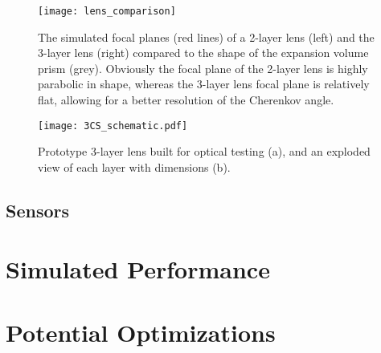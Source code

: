 \begin{figure}[ht]
	\centering
	\texttt{[image: lens\_comparison]}
	\caption{The simulated focal planes (red lines) of a 2-layer lens (left) and the 3-layer lens (right) compared to the shape of the expansion volume prism (grey). Obviously the focal plane of the 2-layer lens is highly parabolic in shape, whereas the 3-layer lens focal plane is relatively flat, allowing for a better resolution of the Cherenkov angle.}
	\label{fig:lens_focal_plane}
\end{figure}

\begin{figure}[ht]
	\centering
	\texttt{[image: 3CS\_schematic.pdf]}
	\caption{Prototype 3-layer lens built for optical testing (a), and an exploded view of each layer with dimensions (b).}
	\label{fig:3CS_schematic}
\end{figure}

\subsection{Sensors}

\section{Simulated Performance}

\section{Potential Optimizations}